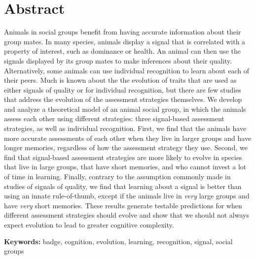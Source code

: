 \section*{Abstract}
Animals in social groups benefit from having accurate information about their group mates. In many species, animals display a signal that is correlated with a property of interest, such as dominance or health. An animal can then use the signals displayed by its group mates to make inferences about their quality. Alternatively, some animals can use individual recognition to learn about each of their peers. Much is known about the the evolution of traits that are used as either signals of quality or for individual recognition, but there are few studies that address the evolution of the assessment strategies themselves. We develop and analyze a theoretical model of an animal social group, in which the animals assess each other using different strategies: three signal-based assessment strategies, as well as individual recognition. First, we find that the animals have more accurate assessments of each other when they live in larger groups and have longer memories, regardless of how the assessment strategy they use. Second, we find that signal-based assessment strategies are more likely to evolve in species that live in large groups, that have short memories, and who cannot invest a lot of time in learning. Finally, contrary to the assumption commonly made in studies of signals of quality, we find that learning about a signal is better than using an innate rule-of-thumb, except if the animals live in \emph{very} large groups and have \emph{very} short memories. These results generate testable predictions for when different assessment strategies should evolve and show that we should not always expect evolution to lead to greater cognitive complexity. 


\textbf{Keywords:} badge, cognition, evolution, learning, recognition, signal, social groups

\newpage
